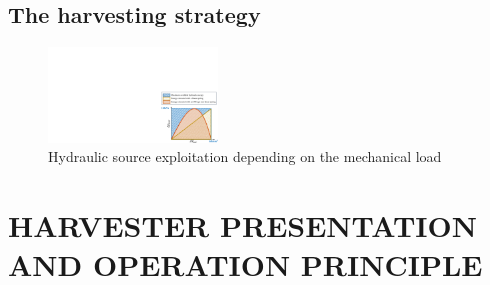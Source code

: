 \documentclass[3p,twocolumn,preprint]{elsarticle}
\begin{document}
	\subsection{The harvesting strategy}	
	\label{The harvesting strategy}
\begin{figure}[!htbp]
	\centering
	\captionsetup{justification=centering}
	\includegraphics[trim={22.5cm 0cm 0cm 8.8cm},clip, width=0.4\textwidth]{figures/OB_vs_LINEAR.pdf}
	\caption{Hydraulic source exploitation depending on the mechanical load}
	\label{fig:OB_vs_LINEAR}
\end{figure}

\section{HARVESTER PRESENTATION AND OPERATION \mbox{PRINCIPLE}}
\label{sec:HARVESTER PRESENTATION AND OPERATION PRINCIPLE}
\end{document}
